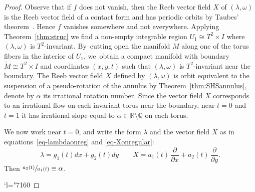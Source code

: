 \documentclass[JEP,XML,SOM,Unicode,NoEqCountersInSection,NoFloatCountersInSection,published]{cedram}
\newcommand{\Changel}{\mathcode`l="7160}
\theoremstyle{definition}
\newcommand{\pp}[2]{\frac{\partial#1}{\partial#2}}
\begin{document}
\begin{proof}
Observe that if $f$ does not vanish, then the Reeb vector field $X$ of $(\lambda, \omega)$ is the Reeb vector field of a contact form and has periodic orbits by Taubes' theorem~\cite{Taub}. Hence $f$ vanishes somewhere and not everywhere. Applying Theorem~\ref{thm:struc} we find a non-empty integrable region $U_1\cong T^2\times I$ where $(\lambda,\omega)$ is $T^2$-invariant. By~cutting open the manifold $M$ along one of the torus fibers in the interior of $U_1$, we~obtain a compact manifold with boundary $\widetilde M\cong T^2\times I$ and coordinates $(x,y,t)$ such that $(\lambda,\omega)$ is $T^2$-invariant near the boundary. The Reeb vector field $X$ defined by $(\lambda,\omega)$ is orbit equivalent to the suspension of a pseudo-rotation of the annulus by Theorem~\ref{thm:SHSannulus}, denote by $\alpha$ its irrational rotation number. Since the vector field $X$ corresponds to an irrational flow on each invariant torus near the boundary, near $t=0$ and $t=1$ it has irrational slope equal to $\alpha\in\mathbb{R}\setminus\mathbb{Q}$ on each torus.

We now work near $t=0$, and write the form $\lambda$ and the vector field $X$ as in equations~\eqref{eq-lambdaonreg} and \eqref{eq-Xonregular}:
\[
\lambda=g_1(t)dx+g_2(t)dy \qquad X= a_1(t)\,\pp{}{x}+a_2(t)\,\pp{}{y}.
\]
Then $\sfrac{a_2(t)}{a_1(t)}\equiv \alpha$.

\Changel


\end{proof}
\end{document}
